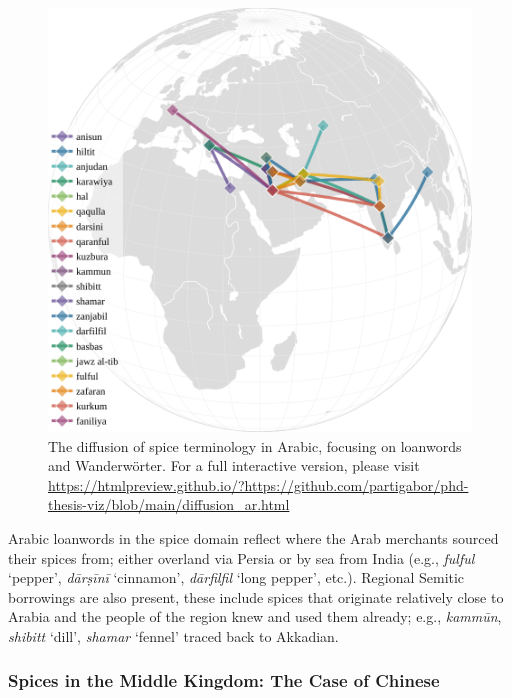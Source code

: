 \begin{figure}[ht!]
    \includegraphics[width=\linewidth]{imgs/plots/diffusion_ar.pdf}
    \caption{The diffusion of spice terminology in Arabic, focusing on loanwords and Wanderwörter. For a full interactive version, please visit \url{https://htmlpreview.github.io/?https://github.com/partigabor/phd-thesis-viz/blob/main/diffusion_ar.html}}
    \label{fig:diffusion_ar}
\end{figure}

Arabic loanwords in the spice domain reflect where the Arab merchants sourced their spices from; either overland via Persia or by sea from India (e.g., \textit{fulful} `pepper', \textit{dārṣīnī} `cinnamon', \textit{dārfilfil} `long pepper', etc.). Regional Semitic borrowings are also present, these include spices that originate relatively close to Arabia and the people of the region knew and used them already; e.g., \textit{kammūn}, \textit{shibitt} `dill', \textit{shamar} `fennel' traced back to Akkadian.

\subsubsection{Spices in the Middle Kingdom: The Case of Chinese }



